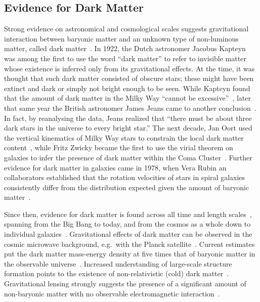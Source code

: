 \subsection{Evidence for Dark Matter}

Strong evidence on astronomical and cosmological scales suggests gravitational interaction between baryonic matter and an unknown type of non-luminous matter, called dark matter~\cite{Bertone:2004pz,Bertone:2016nfn}. In 1922, the Dutch astronomer Jacobus Kapteyn was among the first to use the word ``dark matter'' to refer to invisible matter whose existence is inferred only from its gravitational effects. At the time, it was thought that such dark matter consisted of obscure stars; these might have been extinct and dark or simply not bright enough to be seen. While Kapteyn found that the amount of dark matter in the Milky Way ``cannot be excessive''~\cite{Kapteyn:1922zz}, later that same year the British astronomer James Jeans came to another conclusion~\cite{Jeans:1922}. In fact, by reanalysing the data, Jeans realized that ``there must be about three dark stars in the universe to every bright star.'' The next decade, Jan Oort used the vertical kinematics of Milky Way stars to constrain the local dark matter content~\cite{Oort:1932}, while Fritz Zwicky became the first to use the virial theorem on galaxies to infer the presence of dark matter within the Coma Cluster~\cite{Zwicky:1933gu}. Further evidence for dark matter in galaxies came in 1978, when Vera Rubin an collaborators established that the rotation velocities of stars in spiral galaxies consistently differ from the distribution expected given the amount of baryonic matter~\cite{Rubin:1970zza}. 

Since then, evidence for dark matter is found across all time and length scales~\cite{Lisanti:2016jxe}, spanning from the Big Bang to today, and from the cosmos as a whole down to individual galaxies~\cite{Kolb:1990vq}. Gravitational effects of dark matter can be observed in the cosmic microwave background, e.g.~with the Planck satellite~\cite{Akrami:2018vks}. Current estimates put the dark matter mass-energy density at five times that of baryonic matter in the observable universe~\cite{Aghanim:2018eyx}. Increased understanding of large-scale structure formation points to the existence of non-relativistic (cold) dark matter~\cite{Springel:2006vs,Knobel:2012wa,Coil:2012vw}. Gravitational lensing strongly suggests the presence of a significant amount of non-baryonic matter with no observable electromagnetic interaction~\cite{Bartelmann:1999yn}. 

